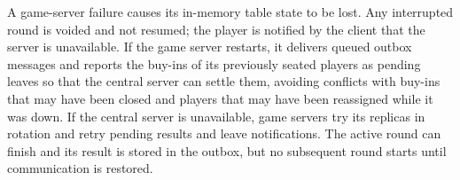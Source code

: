 \documentclass{scrartcl}
\begin{document}
A game-server failure causes its in-memory table state to be lost. Any interrupted round is voided and not resumed; the player is notified by the client
that the server is unavailable.
If the game server restarts, it delivers queued outbox messages and 
reports the buy-ins of its previously seated players as pending leaves so that the central server can settle them,
avoiding conflicts with buy-ins that may have been closed and players that may have been reassigned while it was down.
If the central server is unavailable, game servers try its replicas in rotation and retry pending results and leave notifications. 
The active round can finish and its result is stored in the outbox, but no subsequent round starts until communication 
is restored.

\end{document}
